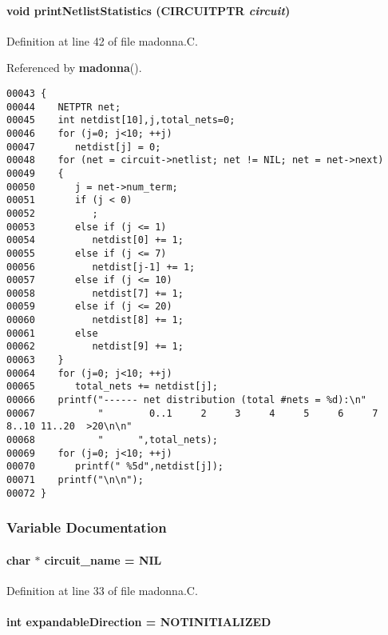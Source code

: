 \paragraph{\setlength{\rightskip}{0pt plus 5cm}void print\-Netlist\-Statistics (CIRCUITPTR {\em circuit})\hspace{0.3cm}{\tt  [static]}}\hfill



Definition at line 42 of file madonna.C.

Referenced by {\bf madonna}().\small\begin{verbatim}00043 {
00044    NETPTR net;
00045    int netdist[10],j,total_nets=0;
00046    for (j=0; j<10; ++j)
00047       netdist[j] = 0;
00048    for (net = circuit->netlist; net != NIL; net = net->next)
00049    {
00050       j = net->num_term;
00051       if (j < 0)
00052          ;
00053       else if (j <= 1)
00054          netdist[0] += 1;
00055       else if (j <= 7)
00056          netdist[j-1] += 1;
00057       else if (j <= 10)
00058          netdist[7] += 1;
00059       else if (j <= 20)
00060          netdist[8] += 1;
00061       else
00062          netdist[9] += 1;
00063    }
00064    for (j=0; j<10; ++j)
00065       total_nets += netdist[j];
00066    printf("------ net distribution (total #nets = %d):\n"
00067           "        0..1     2     3     4     5     6     7 8..10 11..20  >20\n\n"
00068           "      ",total_nets);
00069    for (j=0; j<10; ++j)
00070       printf(" %5d",netdist[j]);
00071    printf("\n\n");
00072 }
\end{verbatim}\normalsize 


\subsubsection{Variable Documentation}
\label{madonna.C_a12}
\paragraph{\setlength{\rightskip}{0pt plus 5cm}char $\ast$ circuit\_\-name = NIL}\hfill



Definition at line 33 of file madonna.C.\label{madonna.C_a3}
\paragraph{\setlength{\rightskip}{0pt plus 5cm}int expandable\-Direction = NOTINITIALIZED}\hfill



